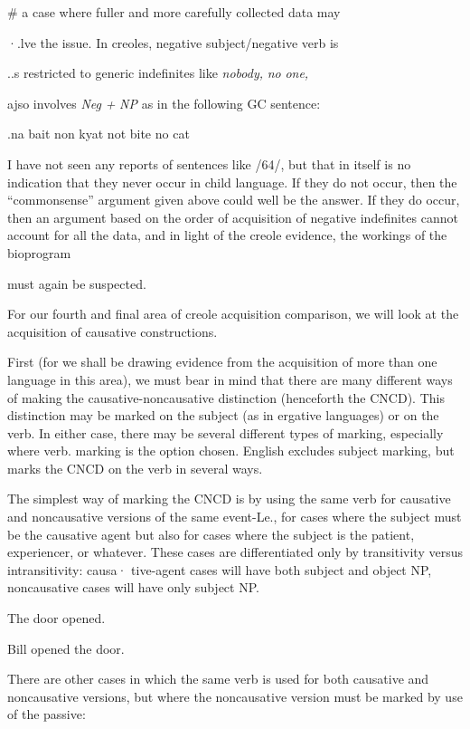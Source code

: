 \# a case where fuller and more carefully collected data may

·.lve the issue. In creoles, negative subject/negative verb is

..s restricted to generic indefinites like \textit{nobody,} \textit{no} \textit{one,}

ajso involves \textit{Neg }\textit{+} \textit{NP }as in the following GC sentence:

.na bait non kyat not bite no cat


I have not seen any reports of sentences like /64/, but that in itself is no indication that they never occur in child language. If they do not occur, then the ``commonsense'' argument given above could well be the answer. If they do occur, then an argument based on the order of acquisition of negative indefinites cannot account for all the data, and in light of the creole evidence, the workings of the bioprogram

must again be suspected.

For our fourth and final area of creole acquisition comparison, we will look at the acquisition of causative constructions.

First (for we shall be drawing evidence from the acquisition of
more than one language in this area), we must bear in mind that there are many different ways of making the causative-noncausative dis\-tinction (henceforth the CNCD). This distinction may be marked on the subject (as in ergative languages) or on the verb. In either case, there may be several different types of marking, especially where verb. marking is the option chosen. English excludes subject marking, but marks the CNCD on the verb in several ways.

The simplest way of marking the CNCD is by using the same
verb for causative and noncausative versions of the same event-Le., for cases where the subject must be the causative agent but also for cases where the subject is the patient, experiencer, or whatever. These cases are differentiated only by transitivity versus intransitivity: causa· tive-agent cases will have both subject and object NP, noncausative
cases will have only subject NP.

\ea\label{ex:65}
 The door opened.
\glt
\z

\ea\label{ex:66}
 Bill opened the door.
\glt
\z

There are other cases in which the same verb is used for both causative and noncausative versions, but where the noncausative version must be marked by use of the passive:

